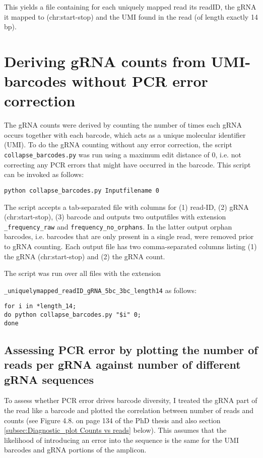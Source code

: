 This yields a file containing for each uniquely mapped read its readID, the gRNA it mapped to (chr:start-stop) and the UMI found in the read (of length exactly 14 bp).


\section{Deriving gRNA counts from UMI-barcodes without PCR error correction}

The gRNA counts were derived by counting the number of times each gRNA occurs together with each barcode, which acts as a unique molecular identifier (UMI). To do the gRNA counting without any error correction, the script \verb|collapse_barcodes.py| was run using a maximum edit distance of 0, i.e. not correcting any PCR errors that might have occurred in the barcode. This script can be invoked as follows:

\begin{small}\begin{lstlisting}
python collapse_barcodes.py Inputfilename 0
\end{lstlisting}\end{small}

The script accepts a tab-separated file with columns for (1) read-ID, (2) gRNA (chr:start-stop), (3) barcode and outputs two outputfiles with extension \verb|_frequency_raw| and \verb|frequency_no_orphans|. In the latter output orphan barcodes, i.e. barcodes that are only present in a single read, were removed prior to gRNA counting. Each output file has two comma-separated columns listing (1) the gRNA (chr:start-stop) and (2) the gRNA count.

The script was run over all files with the extension

\verb|_uniquelymapped_readID_gRNA_5bc_3bc_length14| as follows:

\begin{small}\begin{lstlisting}
for i in *length_14;
do python collapse_barcodes.py "$i" 0;
done
\end{lstlisting}\end{small}


\subsection{Assessing PCR error by plotting the number of reads per gRNA against number of different gRNA sequences}

To assess whether PCR error drives barcode diversity, I treated the gRNA part of the read like a barcode and plotted the correlation between number of reads and counts (see Figure 4.8. on page 134 of the PhD thesis and also section  \ref{subsec:Diagnostic_plot Counts vs reads} below). This assumes that the likelihood of introducing an error into the sequence is the same for the UMI barcodes and gRNA portions of the amplicon.

